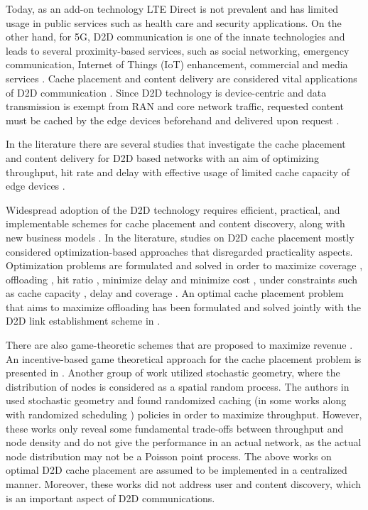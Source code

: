 \documentclass[10pt,a4paper,twocolumn]{article}
\begin{document}
Today, as an add-on technology LTE Direct is not prevalent and has limited usage in public services such as health care and security applications. On the other hand, for 5G, D2D communication is one of the innate technologies and leads to several proximity-based services, such as social networking, emergency communication, Internet of Things (IoT) enhancement, commercial and media services \cite{wuwhitepaper}. Cache placement and content delivery are considered vital applications of D2D communication \cite{chiasserini2015content}. Since D2D technology is device-centric and data transmission is exempt from RAN and core network traffic, requested content must be cached by the edge devices beforehand and delivered upon request \cite{Bastug2014LivingontheEdge}.

In the literature there are several studies that investigate  the cache placement and content delivery for D2D based networks with an aim of optimizing throughput, hit rate and delay with effective usage of limited cache capacity of edge devices \cite{chen2017cache, zhang2017user, lin2017extensive, xu2018towards, sun2019cost, sun2020delay, zhang2019d2d, ji2015throughput}.

Widespread adoption of the D2D technology requires efficient, practical, and implementable schemes for cache placement and content discovery, along with new business models \cite{chiasserini2015content}. In the literature, studies on D2D cache placement mostly considered optimization-based approaches that disregarded practicality aspects. Optimization problems are formulated and solved in order to maximize coverage \cite{chen2017cache},  offloading \cite{zhang2017user}, hit ratio \cite{xu2018towards, AnjumCache2019, LinCaching2020, Soleimani2018Caching}, minimize delay \cite{lin2017extensive, sun2020delay} and minimize cost \cite{sun2019cost}, under constraints such as  cache capacity \cite{LinCaching2020}, delay and coverage \cite{Soleimani2018Caching}. An optimal cache placement problem that aims to maximize offloading has been formulated and solved jointly with the D2D link establishment scheme in \cite{ZhaoCaching2018}.

There are also game-theoretic schemes that are proposed to maximize revenue \cite{zhang2019d2d}. An incentive-based game theoretical approach for the cache placement problem is presented in \cite{Zhu2016Incentive}.  Another group of work utilized stochastic geometry, where the distribution of nodes is considered as a spatial random process. The authors in \cite{chen2017optimal, chen2017high,ChenCaching2017, lee2018caching, amer2020optimized} used stochastic geometry and found randomized caching (in some works along with randomized scheduling \cite{chen2017optimal} ) policies in order to maximize throughput. However, these works only reveal some fundamental trade-offs between throughput and node density and do not give the performance in an actual network, as the actual node distribution may not be a Poisson point process. The above works on optimal D2D cache placement are assumed to be implemented in a centralized manner. Moreover, these works did not address user and content discovery, which is an important aspect of D2D communications.
\end{document}
